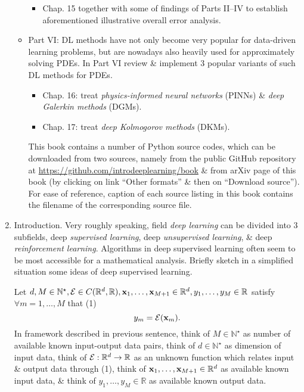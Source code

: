 \documentclass{article}
\begin{document}
\begin{enumerate}
\begin{itemize}
\begin{itemize}
			\item Chap. 15 together with some of findings of Parts II--IV to establish aforementioned illustrative overall error analysis.
		\end{itemize}
		\item Part VI: DL methods have not only become very popular for data-driven learning problems, but are nowadays also heavily used for approximately solving PDEs. In Part VI review \& implement 3 popular variants of such DL methods for PDEs.
		\begin{itemize}
			\item Chap. 16: treat {\it physics-informed neural networks} (PINNs) \& {\it deep Galerkin methods} (DGMs).
			\item Chap. 17: treat {\it deep Kolmogorov methods} (DKMs).
		\end{itemize}
		This book contains a number of Python source codes, which can be downloaded from two sources, namely from the public GitHub repository at \url{https://github.com/introdeeplearning/book} \& from arXiv page of this book (by clicking on link ``Other formats'' \& then on ``Download source''). For ease of reference, caption of each source listing in this book contains the filename of the corresponding source file.		
	\end{itemize}
	
	\item {\sf Introduction.} Very roughly speaking, field {\it deep learning} can be divided into 3 subfields, deep {\it supervised learning}, deep {\it unsupervised learning}, \& deep {\it reinforcement learning}. Algorithms in deep supervised learning often seem to be most accessible for a mathematical analysis. Briefly sketch in a simplified situation some ideas of deep supervised learning.
	
	Let $d,M\in\mathbb{N}^\star,{\cal E}\in C(\mathbb{R}^d,\mathbb{R}),{\bf x}_1,\ldots,{\bf x}_{M+1}\in\mathbb{R}^d,y_1,\ldots,y_M\in\mathbb{R}$ satisfy $\forall m = 1,\ldots,M$ that (1)
	\begin{equation}
		y_m = {\cal E}({\bf x}_m).
	\end{equation}
	In framework described in previous sentence, think of $M\in\mathbb{N}^\star$ as number of available known input-output data pairs, think of $d\in\mathbb{N}^\star$ as dimension of input data, think of ${\cal E}:\mathbb{R}^d\to\mathbb{R}$ as an unknown function which relates input \& output data through (1), think of ${\bf x}_1,\ldots,{\bf x}_{M+1}\in\mathbb{R}^d$ as available known input data, \& think of $y_1,\ldots,y_M\in\mathbb{R}$ as available known output data.
	

\end{enumerate}
\end{document}
